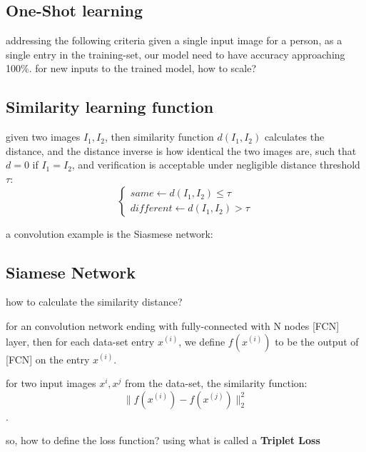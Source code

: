 \documentclass[4apaper,12pt]{book}
\begin{document}
  \subsection{One-Shot learning}
  \begin{description}
  \item addressing the following criteria given a single input image for a person, as a single entry in the training-set, our model need to have accuracy approaching 100\%. for new inputs to the trained model, how to scale?
    \subsection{Similarity learning function}
    \begin{description}
    \item given two images $I_1,I_2$, then similarity function $d(I_1,I_2)$ calculates the distance, and the distance inverse is how identical the two images are, such that $d=0$ if $I_1=I_2$, and verification is acceptable under negligible distance threshold $\tau$: $$
      \begin{cases}
        same  \leftarrow d(I_1,I_2) \leq \tau \\
        different \leftarrow d(I_1,I_2) > \tau
      \end{cases}
      $$
      \item a convolution example is the Siasmese network:
    \end{description}
    \subsection{Siamese Network}
  \item how to calculate the similarity distance?
    \begin{description}
    \item for an convolution network ending with fully-connected with N nodes [FCN] layer, then for each data-set entry $x^{(i)}$, we define $f(x^{(i)})$ to be the output of [FCN] on the entry $x^{(i)}$.
    \item for two input images $x^i, x^j$ from the data-set, the similarity function: $$ \|f(x^{(i)}) - f(x^{(j)})\|_2^2 $$.
    \item so, how to define the loss function? using what is called a \textbf{Triplet Loss}

\end{description}
\end{description}
\end{document}
